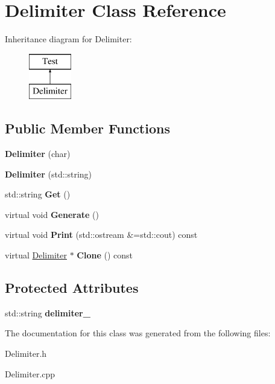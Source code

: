 \hypertarget{class_delimiter}{}\section{Delimiter Class Reference}
\label{class_delimiter}
Inheritance diagram for Delimiter\+:\begin{figure}[H]
\begin{center}
\leavevmode
\includegraphics[height=2.000000cm]{class_delimiter}
\end{center}
\end{figure}
\subsection*{Public Member Functions}
\begin{DoxyCompactItemize}
\item 
\mbox{\label{class_delimiter_a3f71d4befe98c343885843020d73fe57}} 
{\bfseries Delimiter} (char)
\item 
\mbox{\label{class_delimiter_a7f8b3d11a61da117b16266698e3970f9}} 
{\bfseries Delimiter} (std\+::string)
\item 
\mbox{\label{class_delimiter_a41243428a72c32819ac06054eceb1849}} 
std\+::string {\bfseries Get} ()
\item 
\mbox{\label{class_delimiter_a97018f86a44c47accc7159005b6a8c51}} 
virtual void {\bfseries Generate} ()
\item 
\mbox{\label{class_delimiter_acb6a47271dbe1bda372e1a80bcfad31b}} 
virtual void {\bfseries Print} (std\+::ostream \&=std\+::cout) const
\item 
\mbox{\label{class_delimiter_a50030fab46791d71fe369bada8bd2b89}} 
virtual \hyperlink{class_delimiter}{Delimiter} $\ast$ {\bfseries Clone} () const
\end{DoxyCompactItemize}
\subsection*{Protected Attributes}
\begin{DoxyCompactItemize}
\item 
\mbox{\label{class_delimiter_a84e0f61d961047ae5badb99a132ddfc2}} 
std\+::string {\bfseries delimiter\+\_\+}
\end{DoxyCompactItemize}


The documentation for this class was generated from the following files\+:\begin{DoxyCompactItemize}
\item 
Delimiter.\+h\item 
Delimiter.\+cpp\end{DoxyCompactItemize}
